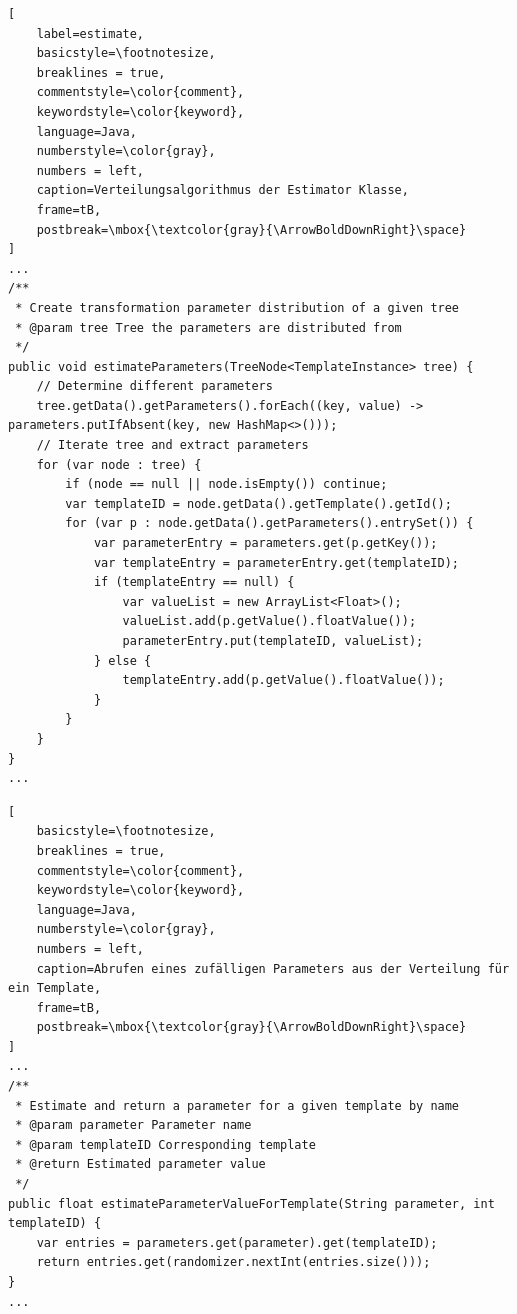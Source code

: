 \begin{lstlisting}[
    label=estimate,
    basicstyle=\footnotesize,
    breaklines = true,
    commentstyle=\color{comment},
    keywordstyle=\color{keyword},
    language=Java,
    numberstyle=\color{gray},
    numbers = left,
    caption=Verteilungsalgorithmus der Estimator Klasse,
    frame=tB,
    postbreak=\mbox{\textcolor{gray}{\ArrowBoldDownRight}\space}
]
...
/**
 * Create transformation parameter distribution of a given tree
 * @param tree Tree the parameters are distributed from
 */
public void estimateParameters(TreeNode<TemplateInstance> tree) {
    // Determine different parameters
    tree.getData().getParameters().forEach((key, value) -> parameters.putIfAbsent(key, new HashMap<>()));
    // Iterate tree and extract parameters
    for (var node : tree) {
        if (node == null || node.isEmpty()) continue;
        var templateID = node.getData().getTemplate().getId();
        for (var p : node.getData().getParameters().entrySet()) {
            var parameterEntry = parameters.get(p.getKey());
            var templateEntry = parameterEntry.get(templateID);
            if (templateEntry == null) {
                var valueList = new ArrayList<Float>();
                valueList.add(p.getValue().floatValue());
                parameterEntry.put(templateID, valueList);
            } else {
                templateEntry.add(p.getValue().floatValue());
            }
        }
    }
}
...
\end{lstlisting}

\begin{lstlisting}[
    basicstyle=\footnotesize,
    breaklines = true,
    commentstyle=\color{comment},
    keywordstyle=\color{keyword},
    language=Java,
    numberstyle=\color{gray},
    numbers = left,
    caption=Abrufen eines zufälligen Parameters aus der Verteilung für ein Template,
    frame=tB,
    postbreak=\mbox{\textcolor{gray}{\ArrowBoldDownRight}\space}
]
...
/**
 * Estimate and return a parameter for a given template by name
 * @param parameter Parameter name
 * @param templateID Corresponding template
 * @return Estimated parameter value
 */
public float estimateParameterValueForTemplate(String parameter, int templateID) {
    var entries = parameters.get(parameter).get(templateID);
    return entries.get(randomizer.nextInt(entries.size()));
}
...
\end{lstlisting}

